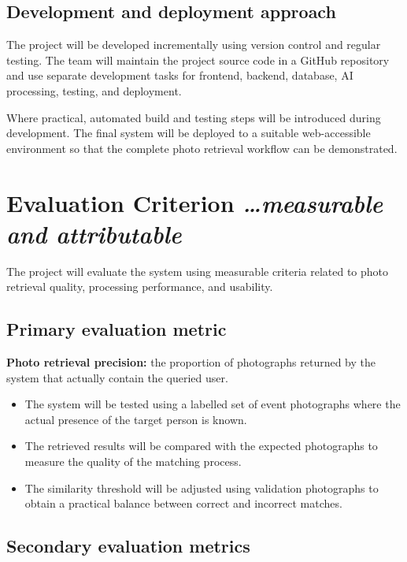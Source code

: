 \documentclass[11pt,a4paper]{article}
\newcommand{\BvrHint}[1]{%
  {\normalfont\normalsize\itshape\hfill #1}}
\begin{document}
\subsection{Development and deployment approach}

The project will be developed incrementally using version control and
regular testing. The team will maintain the project source code in a
GitHub repository and use separate development tasks for frontend,
backend, database, AI processing, testing, and deployment.

Where practical, automated build and testing steps will be introduced
during development. The final system will be deployed to a suitable
web-accessible environment so that the complete photo retrieval
workflow can be demonstrated.

\section{Evaluation Criterion %
  \BvrHint{\ldots measurable and attributable}}

The project will evaluate the system using measurable criteria related
to photo retrieval quality, processing performance, and usability.

\subsection{Primary evaluation metric}

\textbf{Photo retrieval precision:} the proportion of photographs
returned by the system that actually contain the queried user.

\begin{itemize}[leftmargin=0.7cm]
    \item The system will be tested using a labelled set of event
    photographs where the actual presence of the target person is known.

    \item The retrieved results will be compared with the expected
    photographs to measure the quality of the matching process.

    \item The similarity threshold will be adjusted using validation
    photographs to obtain a practical balance between correct and
    incorrect matches.
\end{itemize}

\subsection{Secondary evaluation metrics}
\end{document}

